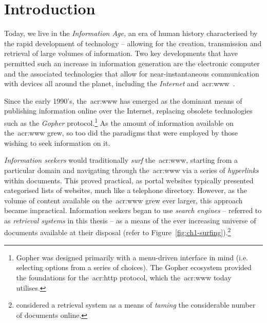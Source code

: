 
\chapter{Introduction}\label{chap:intro}
Today, we live in the \emph{Information Age,} an era of human history characterised by the rapid development of technology -- allowing for the creation, transmission and retrieval of large volumes of information. Two key developments that have permitted such an increase in information generation are the electronic computer and the associated technologies that allow for near-instantaneous communication with devices all around the planet, including the \emph{Internet} and~\gls{acr:www}~\citep{berners1994www}.

\begin{figure}[h]
    \centering
    \vspace{5mm}
    \label{fig:earth_satellites}
    \vspace{-4mm}
\end{figure}

Since the early 1990's, the~\gls{acr:www} has emerged as the dominant means of publishing information online over the Internet, replacing obsolete technologies such as the \emph{Gopher} protocol.\footnote{Gopher was designed primarily with a menu-driven interface in mind (i.e. selecting options from a series of choices). The Gopher ecosystem provided the foundations for the~\gls{acr:http} protocol, which the~\gls{acr:www} today utilises.} As the amount of information available on the~\gls{acr:www} grew, so too did the paradigms that were employed by those wishing to seek information on it.

\emph{Information seekers} would traditionally \emph{surf} the~\gls{acr:www}, starting from a particular domain and navigating through the~\gls{acr:www} via a series of \emph{hyperlinks} within documents. This proved practical, as portal websites typically presented categorised lists of websites, much like a telephone directory. However, as the volume of content available on the~\gls{acr:www} grew ever larger, this approach became impractical. Information seekers began to use \emph{search engines} -- referred to as \emph{retrieval systems} in this thesis -- as a means of  the ever increasing universe of documents available at their disposal (refer to Figure~\ref{fig:ch1-surfing}).\footnote{\cite{mcbryan1994taming_tools} considered a retrieval system as a means of \emph{taming} the considerable number of documents online.}


